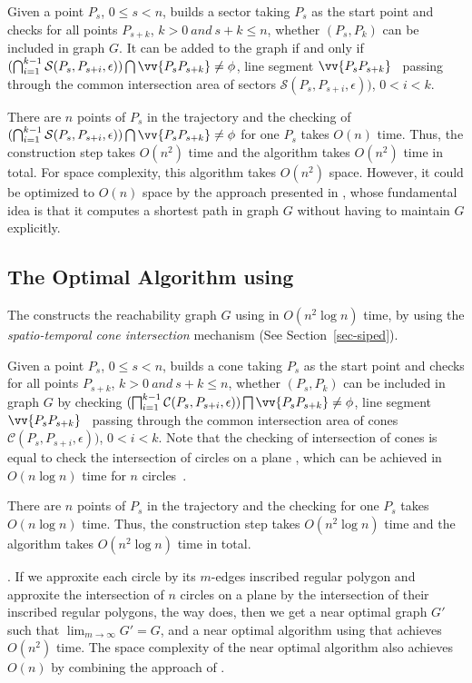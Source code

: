 Given a point $P_s$, $0 \le s < n$, \oped builds a sector taking $P_s$ as the start point and checks for all points $P_{s+k}$, $k>0 ~and~ s+k \le n$, whether $(P_s, P_k)$ can be included in graph $G$. It can be added to the graph if and only if $(\bigcap_{i=1}^{k-1}\mathcal{S}(P_s, P_{s+i}, \epsilon)) \bigcap \vv{P_sP_{s+k}} \ne \phi$, \ie line segment $\vv{P_sP_{s+k}}$ ~passing through the common intersection area of sectors $\mathcal{S}(P_s, P_{s+i}, \epsilon))$, $0<i<k$. 

There are $n$ points of $P_s$ in the trajectory and the checking of $(\bigcap_{i=1}^{k-1}\mathcal{S}(P_s, P_{s+i}, \epsilon)) \bigcap \vv{P_sP_{s+k}} \ne \phi$ for one $P_s$ takes $O(n)$ time.
Thus, the construction step takes $O(n^2)$ time and the algorithm \oped takes $O(n^2)$ time in total.
For space complexity, this algorithm takes $O(n^2)$ space. However, it could be optimized to $O(n)$ space by the approach presented in \cite{Chen:Space}, whose fundamental idea is that it computes a shortest path in graph $G$ without having to maintain $G$ explicitly.


\subsection{The Optimal Algorithm using \sed}
The \osed constructs the reachability graph $G$ using \sed in $O(n^2 \log n)$ time, by using the \textit{spatio-temporal cone intersection} mechanism (See Section~\ref{sec-siped}). 

Given a point $P_s$, $0 \le s < n$, \osed builds a cone taking $P_s$ as the start point and checks for all points $P_{s+k}$, $k>0 ~and~ s+k \le n$, whether $(P_s, P_k)$ can be included in graph $G$ by checking $(\bigsqcap_{i=1}^{k-1}\mathcal{C}(P_s, P_{s+i}, \epsilon)) \bigsqcap \vv{P_sP_{s+k}} \ne \phi$, \ie line segment $\vv{P_sP_{s+k}}$ ~passing through the common intersection area of cones $\mathcal{C}(P_s, P_{s+i}, \epsilon))$, $0<i<k$. Note that the checking of intersection of cones is equal to check the intersection of circles on a plane \cite{Lin:Cised}, which can be achieved in $O(n \log n)$ time for $n$ circles~\cite{Shamos:Circle}. 

There are $n$ points of $P_s$ in the trajectory and the checking for one $P_s$ takes $O(n \log n)$ time.
Thus, the construction step takes $O(n^2 \log n)$ time and the algorithm \osed takes $O(n^2 \log n)$ time in total.

.
If we approxite each circle by its $m$-edges inscribed regular polygon and approxite the intersection of $n$ circles on a plane by the intersection of their inscribed regular polygons, the way \cised does, then we get a near optimal graph $G'$ such that $\lim_{m \to \infty}{G'=G}$, and a near optimal \lsa algorithm using \sed that achieves $O(n^2)$ time. The space complexity of the near optimal algorithm also achieves $O(n)$ by combining the approach of \cite{Chen:Space}.
 